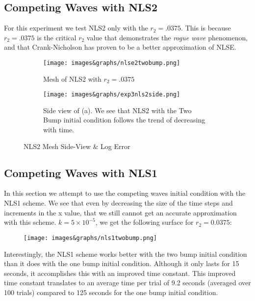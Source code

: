 \documentclass[11pt, oneside]{article}   	%
\begin{document}
\subsection{Competing Waves with NLS2}
For this experiment we test NLS2 only with the $r_2 = .0375$. This is because $r_2 = .0375$ is the critical $r_2$ value that demonstrates the \textit{rogue wave} phenomenon, and that Crank-Nicholson has proven to be a better approximation of NLSE.

\begin{figure}[H]
    \begin{subfigure}{0.5\textwidth}
        \centering\captionsetup{width=.85\linewidth}%
        \texttt{[image: images\&graphs/nlse2twobump.png]}
        \caption{Mesh of NLS2 with $r_2 = .0375$}
        \label{EXP3 NLS2 Side}
    \end{subfigure}
    \begin{subfigure}{0.5\textwidth}
        \centering\captionsetup{width=.85\linewidth}%
        \texttt{[image: images\&graphs/exp3nls2side.png]}
        \caption{Side view of (a). We see that NLS2 with the Two Bump initial condition follows the trend of decreasing with time.}
        \label{EXP3 NLS2 Error}
    \end{subfigure}
\label{fig:image2}
\caption{NLS2 Mesh Side-View \& Log Error}
\end{figure}

\subsection{Competing Waves with NLS1}
In this section we attempt to use the competing waves initial condition with the NLS1 scheme. We see that even by decreasing the size of the time steps and increments in the x value, that we still cannot get an accurate approximation with this scheme. $k = 5\times 10^{-5}$, we get the following surface for $r_2 = 0.0375$:

\begin{figure}[H]
    \centering
    \texttt{[image: images\&graphs/nls1twobump.png]}
    \label{fig:exp2surf}
\end{figure}

Interestingly, the NLS1 scheme works better with the two bump initial condition than it does with the one bump initial condition. Although it only lasts for 15 seconds, it accomplishes this with an improved time constant. This improved time constant translates to an average time per trial of 9.2 seconds (averaged over 100 trials) compared to 125 seconds for the one bump initial condition.
\end{document}

